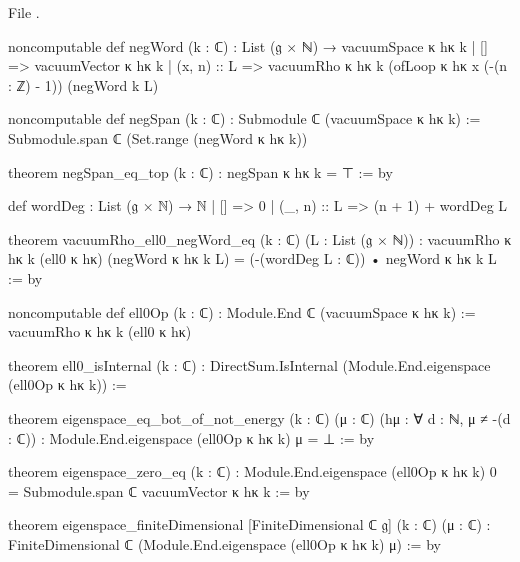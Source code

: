File .
\begin{leancode}
noncomputable def negWord (k : ℂ) : List (𝔤 × ℕ) → vacuumSpace κ hκ k
  | [] => vacuumVector κ hκ k
  | (x, n) :: L => vacuumRho κ hκ k (ofLoop κ hκ x (-(n : ℤ) - 1)) (negWord k L)

noncomputable def negSpan (k : ℂ) : Submodule ℂ (vacuumSpace κ hκ k) :=
  Submodule.span ℂ (Set.range (negWord κ hκ k))

theorem negSpan_eq_top (k : ℂ) : negSpan κ hκ k = ⊤ := by

def wordDeg : List (𝔤 × ℕ) → ℕ
  | [] => 0
  | (_, n) :: L => (n + 1) + wordDeg L

theorem vacuumRho_ell0_negWord_eq (k : ℂ) (L : List (𝔤 × ℕ)) :
    vacuumRho κ hκ k (ell0 κ hκ) (negWord κ hκ k L)
      = (-(wordDeg L : ℂ)) • negWord κ hκ k L := by

noncomputable def ell0Op (k : ℂ) : Module.End ℂ (vacuumSpace κ hκ k) :=
  vacuumRho κ hκ k (ell0 κ hκ)

theorem ell0_isInternal (k : ℂ) :
    DirectSum.IsInternal (Module.End.eigenspace (ell0Op κ hκ k)) :=

theorem eigenspace_eq_bot_of_not_energy (k : ℂ) (μ : ℂ) (hμ : ∀ d : ℕ, μ ≠ -(d : ℂ)) :
    Module.End.eigenspace (ell0Op κ hκ k) μ = ⊥ := by

theorem eigenspace_zero_eq (k : ℂ) :
    Module.End.eigenspace (ell0Op κ hκ k) 0 = Submodule.span ℂ {vacuumVector κ hκ k} := by

theorem eigenspace_finiteDimensional [FiniteDimensional ℂ 𝔤] (k : ℂ) (μ : ℂ) :
    FiniteDimensional ℂ (Module.End.eigenspace (ell0Op κ hκ k) μ) := by
\end{leancode}

